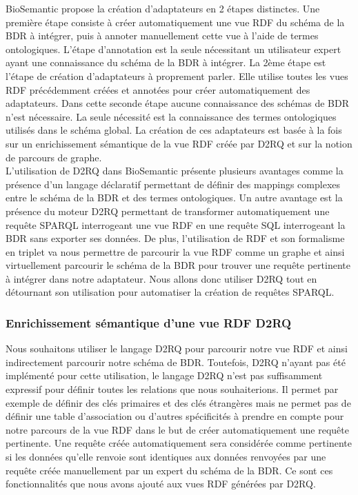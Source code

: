 BioSemantic propose la création d'adaptateurs en 2 étapes distinctes. Une première étape consiste à créer automatiquement une vue RDF du schéma de la BDR à intégrer, puis à annoter manuellement cette vue à l'aide de termes ontologiques. L'étape d'annotation est la seule nécessitant un utilisateur expert ayant une connaissance du schéma de la BDR à intégrer. La 2ème étape est l'étape de création d'adaptateurs à proprement parler. Elle utilise toutes les vues RDF précédemment créées et annotées pour créer automatiquement des adaptateurs. Dans cette seconde étape aucune connaissance des schémas de BDR n'est nécessaire. La seule nécessité est la connaissance des termes ontologiques utilisés dans le schéma global. La création de ces adaptateurs est basée à la fois sur un enrichissement sémantique de la vue RDF créée par D2RQ et sur la notion de parcours de graphe.\\

L'utilisation de D2RQ dans BioSemantic présente plusieurs avantages comme la présence d'un langage déclaratif permettant de définir des mappings complexes entre le schéma de la BDR et des termes ontologiques. Un autre avantage est la présence du moteur D2RQ permettant de transformer automatiquement une requête SPARQL interrogeant une vue RDF en une requête SQL interrogeant la BDR sans exporter ses données. De plus, l'utilisation de RDF et son formalisme en triplet va nous permettre de parcourir la vue RDF comme un graphe et ainsi virtuellement parcourir le schéma de la BDR pour trouver une requête pertinente à intégrer dans notre adaptateur. Nous allons donc utiliser D2RQ tout en détournant son utilisation pour automatiser la création de requêtes SPARQL.

\subsubsection*{Enrichissement sémantique d'une vue RDF D2RQ}
Nous souhaitons utiliser le langage D2RQ pour parcourir notre vue RDF et ainsi indirectement parcourir notre schéma de BDR. Toutefois, D2RQ n'ayant pas été implémenté pour cette utilisation, le langage D2RQ n'est pas suffisamment expressif pour définir toutes les relations que nous souhaiterions. Il permet par exemple de définir des clés primaires et des clés étrangères mais ne permet pas de définir une table d'association ou d'autres spécificités à prendre en compte pour notre parcours de la vue RDF dans le but de créer automatiquement une requête pertinente. Une requête créée automatiquement sera considérée comme pertinente si les données qu'elle renvoie sont identiques aux données renvoyées par une requête créée manuellement par un expert du schéma de la BDR. Ce sont ces fonctionnalités que nous avons ajouté aux vues RDF générées par D2RQ.

